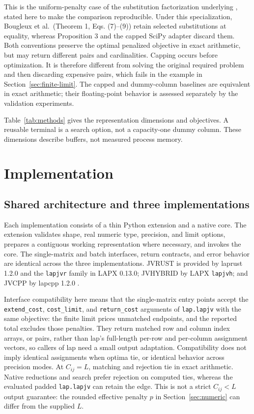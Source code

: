 \documentclass[11pt,a4paper]{article}
\begin{document}
This is the uniform-penalty case of the substitution factorization underlying \cite{bougleux2020}, stated here to make the comparison reproducible. Under this specialization, Bougleux et al.\ (Theorem 1, Eqs. (7)--(9)) retain selected substitutions at equality, whereas Proposition 3 and the capped SciPy adapter discard them. Both conventions preserve the optimal penalized objective in exact arithmetic, but may return different pairs and cardinalities. Capping occurs before optimization. It is therefore different from solving the original required problem and then discarding expensive pairs, which fails in the example in Section~\ref{sec:finite-limit}. The capped and dummy-column baselines are equivalent in exact arithmetic; their floating-point behavior is assessed separately by the validation experiments.

Table~\ref{tab:methods} gives the representation dimensions and objectives. A reusable terminal is a search option, not a capacity-one dummy column. These dimensions describe buffers, not measured process memory.

\FloatBarrier
\section{Implementation}\label{sec:implementation}

\subsection{Shared architecture and three implementations}

Each implementation consists of a thin Python extension and a native core. The extension validates shape, real numeric type, precision, and limit options, prepares a contiguous working representation where necessary, and invokes the core. The single-matrix and batch interfaces, return contracts, and error behavior are identical across the three implementations. JVRUST is provided by laprust 1.2.0 and the \texttt{lapjvr} family in LAPX 0.13.0; JVHYBRID by LAPX \texttt{lapjvh}; and JVCPP by lapcpp 1.2.0 \cite{laprust2026,lapx2026,lapcpp2026}.


Interface compatibility here means that the single-matrix entry points accept the \texttt{extend\_cost}, \texttt{cost\_limit}, and \texttt{return\_cost} arguments of \texttt{lap.lapjv} with the same objective: the finite limit prices unmatched endpoints, and the reported total excludes those penalties. They return matched row and column index arrays, or pairs, rather than lap's full-length per-row and per-column assignment vectors, so callers of lap need a small output adaptation. Compatibility does not imply identical assignments when optima tie, or identical behavior across precision modes. At \(C_{ij}=L\), matching and rejection tie in exact arithmetic. Native reductions and search prefer rejection on computed ties, whereas the evaluated padded \texttt{lap.lapjv} can retain the edge. This is not a strict \(C_{ij}<L\) output guarantee: the rounded effective penalty \(p\) in Section~\ref{sec:numeric} can differ from the supplied \(L\).
\end{document}
